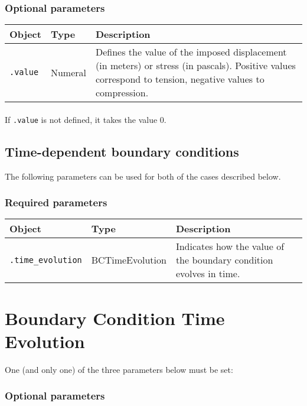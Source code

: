 \documentclass[10pt]{article}
\begin{document}
\subsubsection*{Optional parameters}

\begin{tabularx}{\textwidth}{llX}
\hline 
Object & Type & Description \\ 
\hline 
\verb+.value+ & Numeral & Defines the value of the imposed displacement (in meters) or stress (in pascals). Positive values correspond to tension, negative values to compression.\\ 
\hline 
\end{tabularx}

\paragraph{} If \verb+.value+ is not defined, it takes the value 0.

\subsection{Time-dependent boundary conditions}

The following parameters can be used for both of the cases described below.

\subsubsection*{Required parameters}

\begin{tabularx}{\textwidth}{llX}
\hline 
Object & Type & Description \\ 
\hline 
\verb+.time_evolution+ & BCTimeEvolution & Indicates how the value of the boundary condition evolves in time.\\
\hline 
\end{tabularx}

\section{Boundary Condition Time Evolution}

One (and only one) of the three parameters below must be set:

\subsubsection*{Optional parameters}
\end{document}
